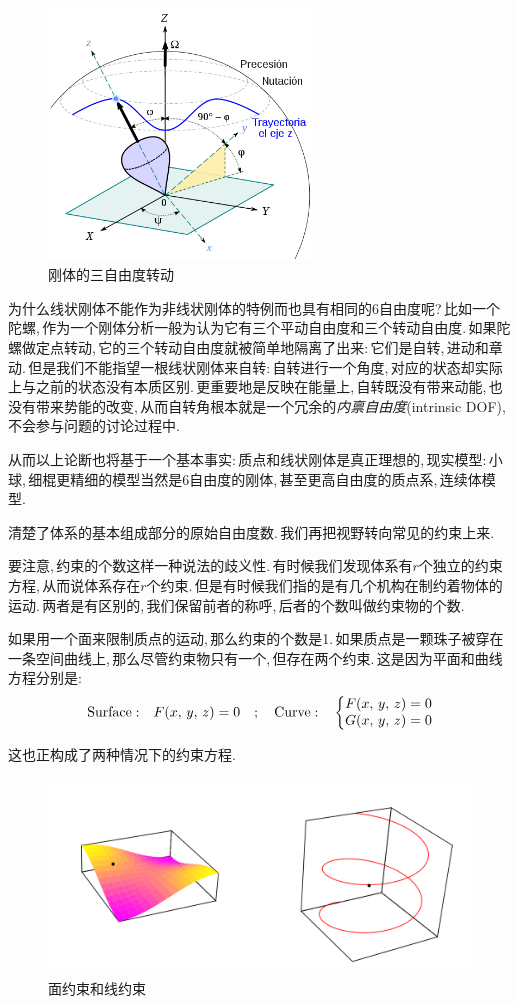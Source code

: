 \begin{figure}
\centering
\includegraphics[width=7cm]{image/6-2-2.png}
\caption{刚体的三自由度转动}
\end{figure}
为什么线状刚体不能作为非线状刚体的特例而也具有相同的6自由度呢?\,比如一个陀螺,\,作为一个刚体分析一般为认为它有三个平动自由度和三个转动自由度.\,如果陀螺做定点转动,\,它的三个转动自由度就被简单地隔离了出来:\,它们是自转,\,进动和章动.\,但是我们不能指望一根线状刚体来自转:\,自转进行一个角度,\,对应的状态却实际上与之前的状态没有本质区别.\,更重要地是反映在能量上,\,自转既没有带来动能,\,也没有带来势能的改变,\,从而自转角根本就是一个冗余的\emph{内禀自由度}(intrinsic DOF),\,不会参与问题的讨论过程中.

从而以上论断也将基于一个基本事实:\,质点和线状刚体是真正理想的,\,现实模型:\,小球,\,细棍更精细的模型当然是6自由度的刚体,\,甚至更高自由度的质点系,\,连续体模型.

清楚了体系的基本组成部分的原始自由度数.\,我们再把视野转向常见的约束上来.

要注意,\,约束的个数这样一种说法的歧义性.\,有时候我们发现体系有$r$个独立的约束方程,\,从而说体系存在$r$个约束.\,但是有时候我们指的是有几个机构在制约着物体的运动.\,两者是有区别的,\,我们保留前者的称呼,\,后者的个数叫做约束物的个数.

如果用一个面来限制质点的运动,\,那么约束的个数是1.\,如果质点是一颗珠子被穿在一条空间曲线上,\,那么尽管约束物只有一个,\,但存在两个约束.\,这是因为平面和曲线方程分别是:
\[{\rm Surface:} \quad F(x,\,y,\,z)=0 \quad;\quad {\rm Curve:} \quad \left\{ \begin{matrix} F(x,\,y,\,z)=0\\ G(x,\,y,\,z)=0\end{matrix}\right.\]

这也正构成了两种情况下的约束方程.
\begin{figure}[H]
\centering
\includegraphics[width=14cm]{image/6-2-3.png}
\caption{面约束和线约束}
\end{figure}

